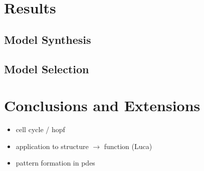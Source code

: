 \section{Results}

\subsection{Model Synthesis}


\subsection{Model Selection}




\section{Conclusions and Extensions}
\label{sec:conclusions}

\begin{itemize}
    \item cell cycle / hopf
    \item application to structure $\rightarrow$ function (Luca)
    \item pattern formation in pdes
\end{itemize}




